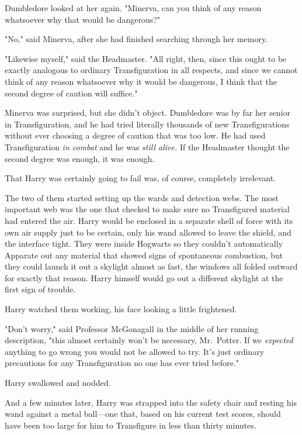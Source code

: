 Dumbledore looked at her again. "Minerva, can you think of any reason
whatsoever why that would be dangerous?"

"No," said Minerva, after she had finished searching through her memory.

"Likewise myself," said the Headmaster. "All right, then, since this ought to
be exactly analogous to ordinary Transfiguration in all respects, and since we
cannot think of any reason whatsoever why it would be dangerous, I think that
the second degree of caution will suffice."

Minerva was surprised, but she didn't object. Dumbledore was by far her senior
in Transfiguration, and he had tried literally thousands of new
Transfigurations without ever choosing a degree of caution that was too low. He
had used Transfiguration \emph{in combat} and he was \emph{still alive.} If the
Headmaster thought the second degree was enough, it was enough.

That Harry was certainly going to fail was, of course, completely irrelevant.

The two of them started setting up the wards and detection webs. The most
important web was the one that checked to make sure no Transfigured material
had entered the air. Harry would be enclosed in a separate shell of force with
its own air supply just to be certain, only his wand allowed to leave the
shield, and the interface tight. They were inside Hogwarts so they couldn't
automatically Apparate out any material that showed signs of spontaneous
combustion, but they could launch it out a skylight almost as fast, the windows
all folded outward for exactly that reason. Harry himself would go out a
different skylight at the first sign of trouble.

Harry watched them working, his face looking a little frightened.

"Don't worry," said Professor McGonagall in the middle of her running
description, "this almost certainly won't be necessary, Mr.~Potter. If we
\emph{expected} anything to go wrong you would not be allowed to try. It's just
ordinary precautions for any Transfiguration no one has ever tried before."

Harry swallowed and nodded.

And a few minutes later, Harry was strapped into the safety chair and resting
his wand against a metal ball---one that, based on his current test scores,
should have been too large for him to Transfigure in less than thirty minutes.

